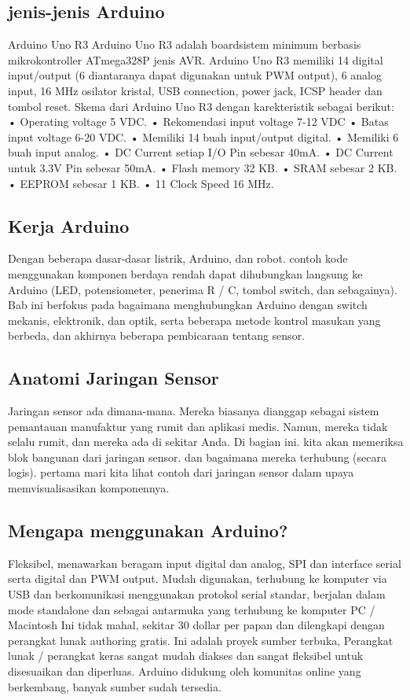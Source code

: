 \subsection{jenis-jenis Arduino}
Arduino Uno R3
Arduino Uno R3 adalah boardsistem minimum berbasis mikrokontroller ATmega328P jenis AVR. Arduino Uno R3 memiliki 14 digital input/output (6
diantaranya dapat digunakan untuk PWM output), 6 analog input, 16 MHz osilator kristal, USB connection, power jack, ICSP header dan tombol reset. Skema dari Arduino Uno R3 dengan
karekteristik sebagai berikut:
• Operating voltage 5 VDC.
• Rekomendasi input voltage 7-12
VDC
• Batas input voltage 6-20 VDC.
• Memiliki 14 buah input/output
digital.
• Memiliki 6 buah input analog.
• DC Current setiap I/O Pin sebesar
40mA.
• DC Current untuk 3.3V Pin sebesar
50mA.
• Flash memory 32 KB.
• SRAM sebesar 2 KB.
• EEPROM sebesar 1 KB.
• 11 Clock Speed 16 MHz.

\subsection{Kerja Arduino}
Dengan beberapa dasar-dasar listrik, Arduino, dan robot.
contoh kode menggunakan komponen berdaya rendah dapat dihubungkan langsung ke Arduino (LED, potensiometer, penerima R / C, tombol switch, dan sebagainya). 
Bab ini berfokus pada bagaimana menghubungkan Arduino dengan switch mekanis, elektronik, dan optik, serta beberapa metode kontrol masukan yang berbeda, dan akhirnya beberapa pembicaraan tentang sensor.

\subsection{Anatomi Jaringan Sensor}
Jaringan sensor ada dimana-mana. Mereka biasanya dianggap sebagai sistem pemantauan manufaktur yang rumit
dan aplikasi medis. Namun, mereka tidak selalu rumit, dan mereka ada di sekitar Anda.
Di bagian ini. kita akan memeriksa blok bangunan dari jaringan sensor. dan bagaimana mereka terhubung (secara logis).
pertama mari kita lihat contoh dari jaringan sensor dalam upaya memvisualisasikan komponennya.

\subsection{Mengapa menggunakan Arduino?}
Fleksibel, menawarkan beragam input digital dan analog, SPI dan interface serial serta digital dan PWM
output. Mudah digunakan, terhubung ke komputer via USB dan berkomunikasi menggunakan protokol serial standar, berjalan
dalam mode standalone dan sebagai antarmuka yang terhubung ke komputer PC / Macintosh
Ini tidak mahal, sekitar 30 dollar per papan dan dilengkapi dengan perangkat lunak authoring gratis. Ini adalah proyek sumber terbuka,
Perangkat lunak / perangkat keras sangat mudah diakses dan sangat fleksibel untuk disesuaikan dan diperluas. Arduino didukung
oleh komunitas online yang berkembang, banyak sumber sudah tersedia.

